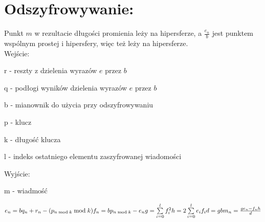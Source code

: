 \documentclass[11pt]{article}
\begin{document}
	\section{Odszyfrowywanie:}
	Punkt \ensuremath{m} w rezultacie długości promienia leży na hipersferze, a \ensuremath{\frac{e_n}{b}} jest punktem wspólnym prostej i hipersfery, więc też leży na hipersferze.\\
	Wejście:
	\begin{description}
	\item r - reszty z dzielenia wyrazów \ensuremath{e} przez \ensuremath{b}
	\item q - podłogi wyników dzielenia wyrazów \ensuremath{e} przez \ensuremath{b}
	\item b - mianownik do użycia przy odszyfrowywaniu
	\item p - klucz
	\item k - długość klucza
	\item l - indeks ostatniego elementu zaszyfrowanej wiadomości
	\end{description} 
	Wyjście:
	\begin{description}
	\item m - wiadmość
	\end{description}
	\ensuremath {
		e_n = bq_n + r_n - (p_{n\bmod{k}}\bmod{k}) \\
		f_n = bp_{n \bmod{k}} - e_n \\
		g = \sum\limits_{i=0}^l f_i^2 \\
		h = 2\sum\limits_{i=0}^l e_if_i \\
		d = gb \\
		m_n = \frac{ge_n - f_nh}{d}
	}
\end{document}
